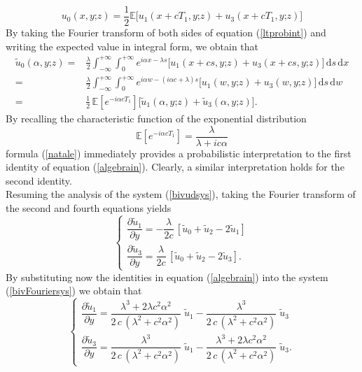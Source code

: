 \documentclass{article}
\begin{document}
\begin{equation}u_0(x,y\mathord{;}z)=\frac{1}{2}\mathbb{E}\Big[u_1(x+cT_1,y\mathord{;}z)+u_3(x+cT_1,y\mathord{;}z)\Big]\label{ltprobint}\end{equation}
By taking the Fourier transform of both sides of equation (\ref{ltprobint}) and writing the expected value in integral form, we obtain that
\begin{align}\widetilde{u}_0(\alpha,y\mathord{;}z)=&\frac{\lambda}{2}\int_{-\infty}^{+\infty}\int_0^{+\infty}e^{i\alpha x-\lambda s}\Big[u_1(x+cs,y\mathord{;}z)+u_3(x+cs,y\mathord{;}z)\Big]\,\mathrm{d}s\,\mathrm{d}x\nonumber\\
=&\frac{\lambda}{2}\int_{-\infty}^{+\infty}\int_0^{+\infty}e^{i\alpha w-(i\alpha c+\lambda) s}\Big[u_1(w,y\mathord{;}z)+u_3(w,y\mathord{;}z)\Big]\,\mathrm{d}s\,\mathrm{d}w\nonumber\\
=&\frac{1}{2}\,\mathbb{E}\left[e^{-i\alpha c T_1}\right]\Big[\widetilde{u}_1(\alpha,y\mathord{;}z)+\widetilde{u}_3(\alpha,y\mathord{;}z)\Big].\label{natale}\end{align}
By recalling the characteristic function of the exponential distribution $$\mathbb{E}\left[e^{-i\alpha c T_1}\right]=\frac{\lambda}{\lambda+ic\alpha}$$
formula (\ref{natale}) immediately provides a probabilistic interpretation to the first identity of equation (\ref{algebrain}). Clearly, a similar interpretation holds for the second identity.\\
Resuming the analysis of the system (\ref{bivudsys}), taking the Fourier transform of the second and fourth equations yields
\begin{equation}\label{bivFouriersys}
\begin{cases}
\dfrac{\partial \widetilde{u}_1}{\partial y}=-\dfrac{\lambda}{2c}\,\left[\widetilde{u}_0+\widetilde{u}_2-2\widetilde{u}_1\right]\\[0.75em]
\dfrac{\partial \widetilde{u}_3}{\partial y}=\dfrac{\lambda}{2c}\,\left[\widetilde{u}_0+\widetilde{u}_2-2\widetilde{u}_3\right].
\end{cases}
\end{equation}
By substituting now the identities in equation (\ref{algebrain}) into the system (\ref{bivFouriersys}) we obtain that
\begin{equation}\label{bivFouriersys2}
\begin{cases}
\dfrac{\partial \widetilde{u}_1}{\partial y}=\dfrac{\lambda^3+2\lambda c^2\alpha^2}{2\,c\,(\lambda^2+c^2\alpha^2)}\;\widetilde{u}_1-\dfrac{\lambda^3}{2\,c\,(\lambda^2+c^2\alpha^2)}\;\widetilde{u}_3\\[0.85em]
\dfrac{\partial \widetilde{u}_3}{\partial y}=\dfrac{\lambda^3}{2\,c\,(\lambda^2+c^2\alpha^2)}\;\widetilde{u}_1-\dfrac{\lambda^3+2\lambda c^2\alpha^2}{2\,c\,(\lambda^2+c^2\alpha^2)}\;\widetilde{u}_3.
\end{cases}
\end{equation}
\end{document}

